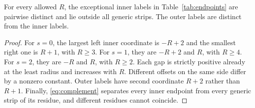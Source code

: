 \begin{lemma}\label{lem:noalias}
For every allowed $R$, the exceptional inner labels in
Table~\ref{tab:endpoints} are pairwise distinct and lie outside all
generic strips. The outer labels are distinct from the inner labels.
\end{lemma}
\begin{proof}
For $s=0$, the largest left inner coordinate is $-R+2$ and the
smallest right one is $R+1$, with $R\ge3$. For $s=1$, they are
$-R+2$ and $R$, with $R\ge4$. For $s=2$, they are $-R$ and
$R$, with $R\ge2$. Each gap is strictly positive already at the
least radius and increases with $R$. Different offsets on the
same side differ by a nonzero constant. Outer labels have second
coordinate $R+2$ rather than $R+1$. Finally,
\eqref{eq:complement} separates every inner endpoint from every
generic strip of its residue, and different residues cannot coincide.
\end{proof}
